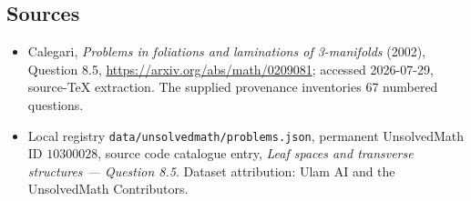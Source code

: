 \documentclass[11pt]{article}
\begin{document}
\subsection{Sources}
\begin{itemize}
\item Calegari, \emph{Problems in foliations and laminations of 3-manifolds} (2002), Question 8.5, \url{https://arxiv.org/abs/math/0209081}; accessed 2026-07-29, source-TeX extraction. The supplied provenance inventories 67 numbered questions.
\item Local registry \texttt{data/unsolvedmath/problems.json}, permanent UnsolvedMath ID $10300028$, source code catalogue entry, \emph{Leaf spaces and transverse structures --- Question 8.5}. Dataset attribution: Ulam AI and the UnsolvedMath Contributors.
\end{itemize}
\end{document}
